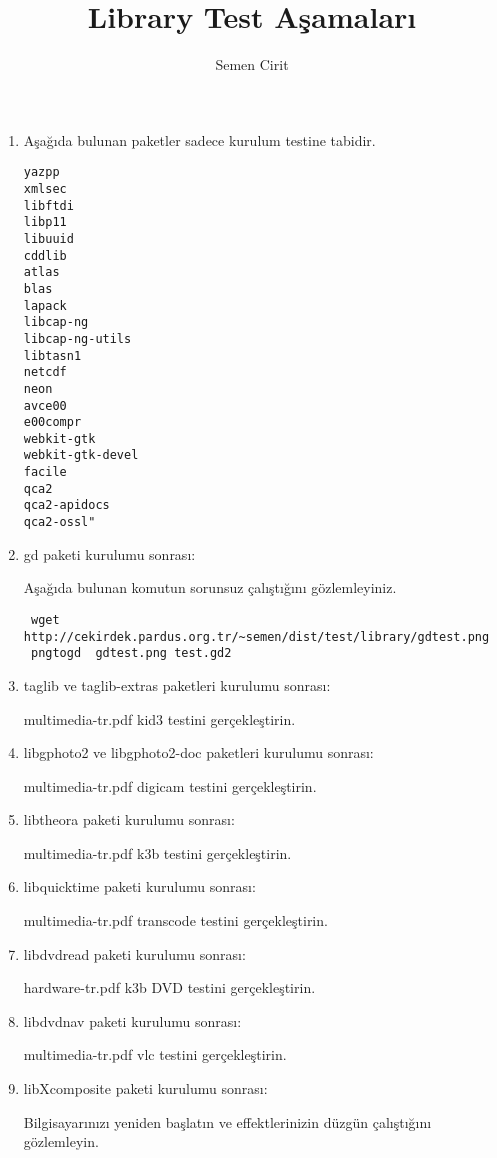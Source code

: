 \documentclass[a4paper,10pt]{article}
\title{Library Test Aşamaları}
\author{Semen Cirit}
\begin{document}
\maketitle
\begin{enumerate}
\item Aşağıda bulunan paketler sadece kurulum testine tabidir.
\begin{verbatim}
yazpp
xmlsec
libftdi
libp11
libuuid
cddlib
atlas
blas
lapack
libcap-ng
libcap-ng-utils
libtasn1
netcdf
neon
avce00
e00compr
webkit-gtk
webkit-gtk-devel
facile
qca2
qca2-apidocs
qca2-ossl"
\end{verbatim}
\item gd paketi kurulumu sonrası:

Aşağıda bulunan komutun sorunsuz çalıştığını gözlemleyiniz.

\begin{verbatim}
 wget http://cekirdek.pardus.org.tr/~semen/dist/test/library/gdtest.png
 pngtogd  gdtest.png test.gd2
\end{verbatim}

\item taglib ve taglib-extras paketleri kurulumu sonrası:

multimedia-tr.pdf kid3 testini gerçekleştirin.

\item libgphoto2 ve libgphoto2-doc paketleri kurulumu sonrası:

multimedia-tr.pdf digicam testini gerçekleştirin.

\item libtheora paketi kurulumu sonrası:

multimedia-tr.pdf k3b testini gerçekleştirin.

\item libquicktime paketi kurulumu sonrası:

multimedia-tr.pdf transcode testini gerçekleştirin.

\item libdvdread paketi kurulumu sonrası:

hardware-tr.pdf k3b DVD testini gerçekleştirin.

\item libdvdnav paketi kurulumu sonrası:

multimedia-tr.pdf vlc testini gerçekleştirin.
\item libXcomposite paketi kurulumu sonrası:

Bilgisayarınızı yeniden başlatın ve effektlerinizin düzgün çalıştığını gözlemleyin.


\end{enumerate}
\end{document}
